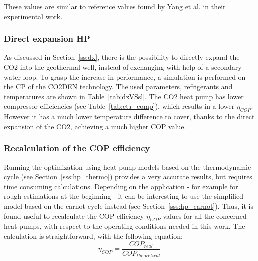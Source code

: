 \documentclass{article}
\begin{document}


These values are similar to reference values found by Yang et al.\cite{yangTheoreticalExperimentalInvestigation2016} in their experimental work.




\subsubsection{Direct expansion HP}\label{sss:DX}
As discussed in Section~\ref{ss:dx}, there is the possibility to directly expand the CO2 into the geothermal well, instead of exchanging with help of a secondary water loop. To grasp the increase in performance, a simulation is performed on the CP of the CO2DEN technology. The used parameters, refrigerants and temperatures are shown in Table~\ref{tab:dxVSsl}. The CO2 heat pump has lower compressor efficiencies (see Table~\ref{tab:eta_comp}), which results in a lower $\eta_{COP}$. However it has a much lower temperature difference to cover, thanks to the direct expansion of the CO2, achieving a much higher COP value.



\subsubsection{Recalculation of the COP efficiency}
Running the optimization using heat pump models based on the thermodynamic cycle (see Section~\ref{sss:hp_thermo}) provides a very accurate results, but requires time consuming calculations. Depending on the application - for example for rough estimations at the beginning - it can be interesting to use the simplified model based on the carnot cycle instead (see Section~\ref{sss:hp_carnot}). Thus, it is found useful to recalculate the COP efficiency $\eta_{COP}$ values for all the concerned heat pumps, with respect to the operating conditions needed in this work. The calculation is straightforward, with the following equation:
\begin{equation}
\eta_{COP} = \frac{COP_{real}}{COP_{theoretical}}
\end{equation}
\end{document}
